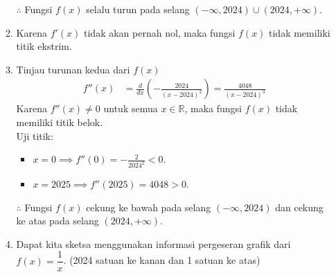 \documentclass[10pt,openany,a4paper]{article}
\newcommand{\R}{\mathbb{R}}
\begin{document}
\begin{enumerate}
\begin{enumerate}
            $\therefore$ Fungsi $f(x)$ selalu turun pada selang $(-\infty, 2024)\cup(2024, +\infty)$.
            \item Karena $f'(x)$ tidak akan pernah nol, maka fungsi $f(x)$ tidak memiliki titik ekstrim.
            \item Tinjau turunan kedua dari $f(x)$
            \begin{align*}
                f''(x) &= \frac{d}{dx}\left(-\frac{2024}{(x-2024)^2}\right) = \frac{4048}{(x-2024)^3}
            \end{align*}
            Karena $f''(x) \neq 0$ untuk semua $x\in\R$, maka fungsi $f(x)$ tidak memiliki titik belok.\\
            Uji titik:
            \begin{itemize}
                \item $x = 0 \implies f''(0) = -\frac{2}{2024^2} < 0$.
                \item $x = 2025 \implies f''(2025) =  4048> 0$.
            \end{itemize}
            \begin{center}
            \end{center}
            $\therefore$ Fungsi $f(x)$ cekung ke bawah pada selang $(-\infty, 2024)$ dan cekung ke atas pada selang $(2024, +\infty)$.
            \item Dapat kita sketsa menggunakan informasi pergeseran grafik dari $f(x)=\dfrac{1}{x}$. (2024 satuan ke kanan dan 1 satuan ke atas)
            \begin{center}
\end{center}
\end{enumerate}
\end{enumerate}
\end{document}
